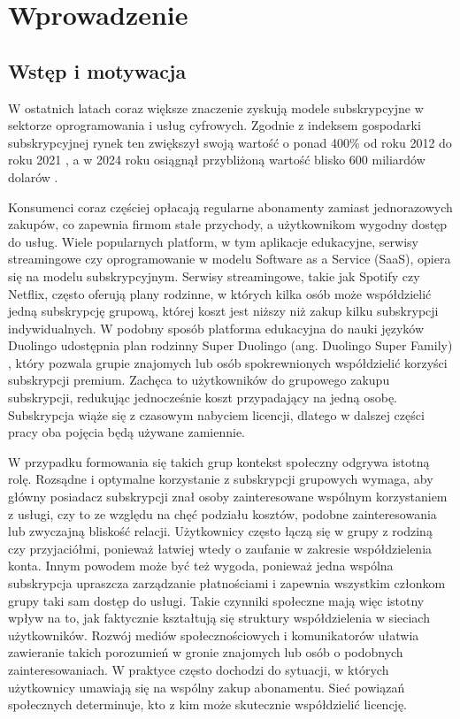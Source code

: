 \chapter{Wprowadzenie}

\section{Wstęp i motywacja}
W ostatnich latach coraz większe znaczenie zyskują modele subskrypcyjne w sektorze oprogramowania i usług cyfrowych. Zgodnie z indeksem gospodarki subskrypcyjnej rynek ten zwiększył swoją wartość o ponad 400\% od roku 2012 do roku 2021 \cite{subscriptionEconomyIndex}, a w 2024 roku osiągnął przybliżoną wartość blisko 600 miliardów dolarów \cite{subscriptionEconomyPrice2024}.

Konsumenci coraz częściej opłacają regularne abonamenty zamiast jednorazowych zakupów, co zapewnia firmom stałe przychody, a użytkownikom wygodny dostęp do usług. Wiele popularnych platform, w tym aplikacje edukacyjne, serwisy streamingowe czy oprogramowanie w modelu Software as a Service (SaaS), opiera się na modelu subskrypcyjnym. Serwisy streamingowe, takie jak Spotify czy Netflix, często oferują plany rodzinne, w których kilka osób może współdzielić jedną subskrypcję grupową, której koszt jest niższy niż zakup kilku subskrypcji indywidualnych. W podobny sposób platforma edukacyjna do nauki języków Duolingo udostępnia plan rodzinny Super Duolingo (ang. Duolingo Super Family) \cite{duolingo_family}, który pozwala grupie znajomych lub osób spokrewnionych współdzielić korzyści subskrypcji premium. Zachęca to użytkowników do grupowego zakupu subskrypcji, redukując jednocześnie koszt przypadający na jedną osobę. Subskrypcja wiąże się z czasowym nabyciem licencji, dlatego w dalszej części pracy oba pojęcia będą używane zamiennie.

W przypadku formowania się takich grup kontekst społeczny odgrywa istotną rolę. Rozsądne i optymalne korzystanie z subskrypcji grupowych wymaga, aby główny posiadacz subskrypcji znał osoby zainteresowane wspólnym korzystaniem z usługi, czy to ze względu na chęć podziału kosztów, podobne zainteresowania lub zwyczajną bliskość relacji. Użytkownicy często łączą się w grupy z rodziną czy przyjaciółmi, ponieważ łatwiej wtedy o zaufanie w zakresie współdzielenia konta. Innym powodem może być też wygoda, ponieważ jedna wspólna subskrypcja upraszcza zarządzanie płatnościami i zapewnia wszystkim członkom grupy taki sam dostęp do usługi. Takie czynniki społeczne mają więc istotny wpływ na to, jak faktycznie kształtują się struktury współdzielenia w sieciach użytkowników. Rozwój mediów społecznościowych i komunikatorów ułatwia zawieranie takich porozumień w gronie znajomych lub osób o podobnych zainteresowaniach. W praktyce często dochodzi do sytuacji, w których użytkownicy umawiają się na wspólny zakup abonamentu. Sieć powiązań społecznych determinuje, kto z kim może skutecznie współdzielić licencję.

